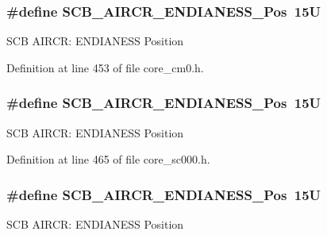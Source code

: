 \subsubsection[{\texorpdfstring{S\+C\+B\+\_\+\+A\+I\+R\+C\+R\+\_\+\+E\+N\+D\+I\+A\+N\+E\+S\+S\+\_\+\+Pos}{SCB_AIRCR_ENDIANESS_Pos}}]{\setlength{\rightskip}{0pt plus 5cm}\#define S\+C\+B\+\_\+\+A\+I\+R\+C\+R\+\_\+\+E\+N\+D\+I\+A\+N\+E\+S\+S\+\_\+\+Pos~15U}\hypertarget{group___c_m_s_i_s___s_c_b_gad31dec98fbc0d33ace63cb1f1a927923}{}\label{group___c_m_s_i_s___s_c_b_gad31dec98fbc0d33ace63cb1f1a927923}
S\+CB A\+I\+R\+CR\+: E\+N\+D\+I\+A\+N\+E\+SS Position 

Definition at line 453 of file core\+\_\+cm0.\+h.

\subsubsection[{\texorpdfstring{S\+C\+B\+\_\+\+A\+I\+R\+C\+R\+\_\+\+E\+N\+D\+I\+A\+N\+E\+S\+S\+\_\+\+Pos}{SCB_AIRCR_ENDIANESS_Pos}}]{\setlength{\rightskip}{0pt plus 5cm}\#define S\+C\+B\+\_\+\+A\+I\+R\+C\+R\+\_\+\+E\+N\+D\+I\+A\+N\+E\+S\+S\+\_\+\+Pos~15U}\hypertarget{group___c_m_s_i_s___s_c_b_gad31dec98fbc0d33ace63cb1f1a927923}{}\label{group___c_m_s_i_s___s_c_b_gad31dec98fbc0d33ace63cb1f1a927923}
S\+CB A\+I\+R\+CR\+: E\+N\+D\+I\+A\+N\+E\+SS Position 

Definition at line 465 of file core\+\_\+sc000.\+h.

\subsubsection[{\texorpdfstring{S\+C\+B\+\_\+\+A\+I\+R\+C\+R\+\_\+\+E\+N\+D\+I\+A\+N\+E\+S\+S\+\_\+\+Pos}{SCB_AIRCR_ENDIANESS_Pos}}]{\setlength{\rightskip}{0pt plus 5cm}\#define S\+C\+B\+\_\+\+A\+I\+R\+C\+R\+\_\+\+E\+N\+D\+I\+A\+N\+E\+S\+S\+\_\+\+Pos~15U}\hypertarget{group___c_m_s_i_s___s_c_b_gad31dec98fbc0d33ace63cb1f1a927923}{}\label{group___c_m_s_i_s___s_c_b_gad31dec98fbc0d33ace63cb1f1a927923}
S\+CB A\+I\+R\+CR\+: E\+N\+D\+I\+A\+N\+E\+SS Position 

